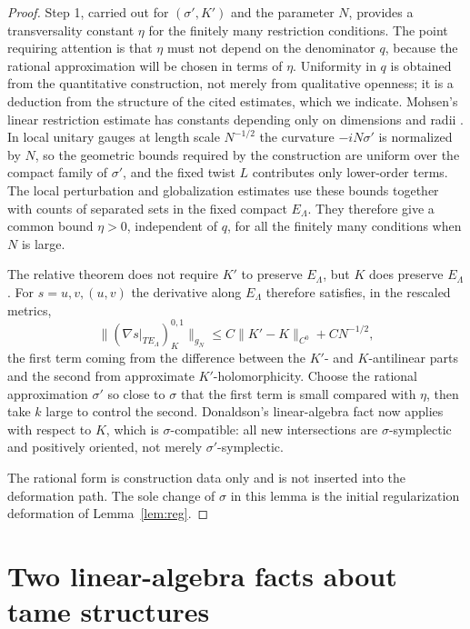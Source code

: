\documentclass[11pt]{article}
\theoremstyle{remark}
\begin{document}
\begin{proof}
Step 1, carried out for $(\sigma',K')$ and the parameter $N$, provides
a transversality constant $\eta$ for the finitely many restriction
conditions. The point requiring attention is that $\eta$ must not
depend on the denominator $q$, because the rational approximation will
be chosen in terms of $\eta$. Uniformity in $q$ is obtained from the
quantitative construction, not merely from qualitative openness; it is
a deduction from the structure of the cited estimates, which we
indicate. Mohsen's linear restriction estimate has constants depending
only on dimensions and radii
\cite[Theorem 6.5 and Corollary 6.6]{Mohsen2019}. In local unitary
gauges at length scale $N^{-1/2}$ the curvature $-iN\sigma'$ is
normalized by $N$, so the geometric bounds required by the construction
are uniform over the compact family of $\sigma'$, and the fixed twist
$L$ contributes only lower-order terms. The local perturbation and
globalization estimates
\cite[Proposition 8.2 and Sections 8.3--8.6]{Mohsen2019} use these
bounds together with counts of separated sets in the fixed compact
$E_\Lambda$. They therefore give a common bound $\eta>0$, independent
of $q$, for all the finitely many conditions when $N$ is large.

The relative theorem does not require $K'$ to preserve $E_\Lambda$, but
$K$ does preserve $E_\Lambda$. For $s=u,v,(u,v)$ the derivative along
$E_\Lambda$ therefore satisfies, in the rescaled metrics,
\[
 \bigl\|(\nabla s|_{TE_\Lambda})^{0,1}_K\bigr\|_{g_N}
 \le C\lVert K'-K\rVert_{C^0}+CN^{-1/2},
\]
the first term coming from the difference between the $K'$- and
$K$-antilinear parts and the second from approximate
$K'$-holomorphicity. Choose the rational approximation $\sigma'$ so
close to $\sigma$ that the first term is small compared with $\eta$,
then take $k$ large to control the second. Donaldson's linear-algebra
fact now applies with respect to $K$, which is $\sigma$-compatible: all
new intersections are $\sigma$-symplectic and positively oriented, not
merely $\sigma'$-symplectic.

The rational form is construction data only and is not inserted into
the deformation path. The sole change of $\sigma$ in this lemma is the
initial regularization deformation of Lemma~\ref{lem:reg}.
\end{proof}


\section{Two linear-algebra facts about tame structures}\label{sec:linear}
\end{document}
